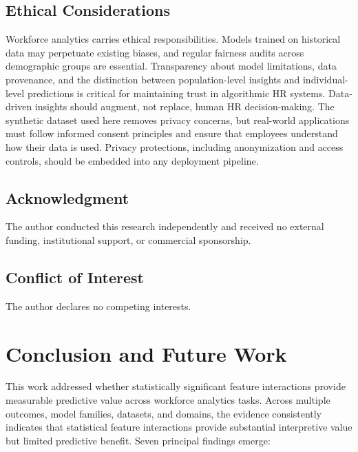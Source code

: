 \documentclass[conference]{IEEEtran}
\newcounter{algorithm}
\begin{document}
\subsection{Ethical Considerations}

Workforce analytics carries ethical responsibilities. Models trained on historical data may perpetuate existing biases, and regular fairness audits across demographic groups are essential. Transparency about model limitations, data provenance, and the distinction between population-level insights and individual-level predictions is critical for maintaining trust in algorithmic HR systems. Data-driven insights should augment, not replace, human HR decision-making. The synthetic dataset used here removes privacy concerns, but real-world applications must follow informed consent principles and ensure that employees understand how their data is used. Privacy protections, including anonymization and access controls, should be embedded into any deployment pipeline.

\subsection*{Acknowledgment}
The author conducted this research independently and received no external funding, institutional support, or commercial sponsorship.

\subsection*{Conflict of Interest}
The author declares no competing interests.

\section{Conclusion and Future Work}
\label{sec:conclusion}

This work addressed whether statistically significant feature interactions provide measurable predictive value across workforce analytics tasks. Across multiple outcomes, model families, datasets, and domains, the evidence consistently indicates that statistical feature interactions provide substantial interpretive value but limited predictive benefit. Seven principal findings emerge:
\end{document}
